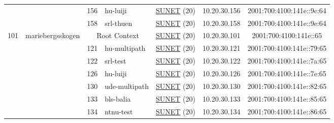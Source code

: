 \begin{small}
\begin{center}
\begin{longtable}{|c|c|c|c|c|c|c|c|}
  &  & \tiny{156} & \multicolumn{1}{|l|}{\tiny{hu-luiji}} & \multicolumn{2}{|c|}{\tiny{\href{http://www.sunet.se}{SUNET} (20)}} & \tiny{10.20.30.156} & \tiny{2001:700:4100:141e::9c:64} \\* \cline{3-3}\cline{4-4}\cline{5-5}\cline{6-6}\cline{7-7}\cline{8-8}
  &  & \tiny{158} & \multicolumn{1}{|l|}{\tiny{srl-thuen}} & \multicolumn{2}{|c|}{\tiny{\href{http://www.sunet.se}{SUNET} (20)}} & \tiny{10.20.30.158} & \tiny{2001:700:4100:141e::9e:64} \\ \hline
 \multirow{16}{*}{\tiny{101}} & \multicolumn{1}{|l|}{\multirow{16}{*}{\tiny{mariebergsskogen}}} & \multicolumn{2}{|c|}{\tiny{Root Context}} & \multicolumn{2}{|c|}{\tiny{\href{http://www.sunet.se}{SUNET} (20)}} & \tiny{10.20.30.101} & \tiny{2001:700:4100:141e::65} \\* \cline{3-3}\cline{4-4}\cline{5-5}\cline{6-6}\cline{7-7}\cline{8-8}
  &  & \tiny{121} & \multicolumn{1}{|l|}{\tiny{hu-multipath}} & \multicolumn{2}{|c|}{\tiny{\href{http://www.sunet.se}{SUNET} (20)}} & \tiny{10.20.30.121} & \tiny{2001:700:4100:141e::79:65} \\* \cline{3-3}\cline{4-4}\cline{5-5}\cline{6-6}\cline{7-7}\cline{8-8}
  &  & \tiny{122} & \multicolumn{1}{|l|}{\tiny{srl-test}} & \multicolumn{2}{|c|}{\tiny{\href{http://www.sunet.se}{SUNET} (20)}} & \tiny{10.20.30.122} & \tiny{2001:700:4100:141e::7a:65} \\* \cline{3-3}\cline{4-4}\cline{5-5}\cline{6-6}\cline{7-7}\cline{8-8}
  &  & \tiny{126} & \multicolumn{1}{|l|}{\tiny{hu-luiji}} & \multicolumn{2}{|c|}{\tiny{\href{http://www.sunet.se}{SUNET} (20)}} & \tiny{10.20.30.126} & \tiny{2001:700:4100:141e::7e:65} \\* \cline{3-3}\cline{4-4}\cline{5-5}\cline{6-6}\cline{7-7}\cline{8-8}
  &  & \tiny{130} & \multicolumn{1}{|l|}{\tiny{ude-multipath}} & \multicolumn{2}{|c|}{\tiny{\href{http://www.sunet.se}{SUNET} (20)}} & \tiny{10.20.30.130} & \tiny{2001:700:4100:141e::82:65} \\* \cline{3-3}\cline{4-4}\cline{5-5}\cline{6-6}\cline{7-7}\cline{8-8}
  &  & \tiny{133} & \multicolumn{1}{|l|}{\tiny{bls-balia}} & \multicolumn{2}{|c|}{\tiny{\href{http://www.sunet.se}{SUNET} (20)}} & \tiny{10.20.30.133} & \tiny{2001:700:4100:141e::85:65} \\* \cline{3-3}\cline{4-4}\cline{5-5}\cline{6-6}\cline{7-7}\cline{8-8}
  &  & \tiny{134} & \multicolumn{1}{|l|}{\tiny{ntnu-test}} & \multicolumn{2}{|c|}{\tiny{\href{http://www.sunet.se}{SUNET} (20)}} & \tiny{10.20.30.134} & \tiny{2001:700:4100:141e::86:65} \\* \cline{3-3}\cline{4-4}\cline{5-5}\cline{6-6}\cline{7-7}\cline{8-8}

\end{longtable}
\end{center}
\end{small}
